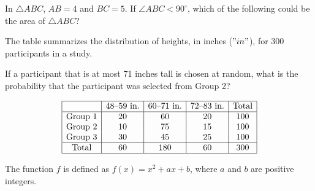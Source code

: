 \vspace{0.75em}


\vspace{2em}
\newpage

\noindent\markforreview
\vspace{1em}

In \(\triangle ABC\), \(AB = 4\) and \(BC = 5\). If \(\angle ABC < 90^\circ\), which of the following could be the area of \(\triangle ABC\)?

\vspace{0.75em}


\vspace{2em}
\newpage

\noindent\markforreview
\vspace{1em}

The table summarizes the distribution of heights, in inches (\("in"\)), for 300 participants in a study.

If a participant that is at most 71 inches tall is chosen at random, what is the probability that the participant was selected from Group 2?

\[
\begin{array}{|c|c|c|c|c|}
\hline
 & \text{48--59 in.} & \text{60--71 in.} & \text{72--83 in.} & \text{Total} \\
\hline
\text{Group 1} & 20 & 60 & 20 & 100 \\
\text{Group 2} & 10 & 75 & 15 & 100 \\
\text{Group 3} & 30 & 45 & 25 & 100 \\
\hline
\text{Total} & 60 & 180 & 60 & 300 \\
\hline
\end{array}
\]

\vspace{0.75em}


\vspace{2em}
\newpage

\noindent\markforreview
\vspace{1em}

The function \(f\) is defined as \(f(x) = x^2 + ax + b\), where \(a\) and \(b\) are positive integers.

